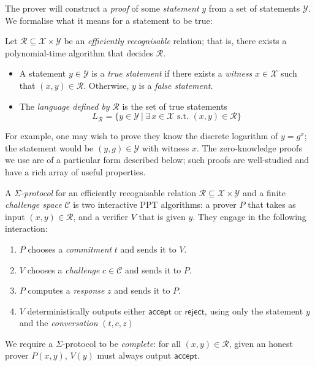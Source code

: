 \documentclass[12pt,a4paper]{article}
\theoremstyle{definition}
\begin{document}
The prover will construct a \textit{proof} of some \textit{statement} $y$ from a set of statements $\mathcal{Y}$. We formalise what it means for a statement to be true:
\begin{definition}
    Let $\mathcal{R}\subseteq\mathcal{X}\times\mathcal{Y}$ be an \textit{efficiently recognisable} relation; that is, there exists a polynomial-time algorithm that decides $\mathcal{R}$.
    \begin{itemize}
        \item A statement $y\in\mathcal{Y}$ is a \textit{true statement} if there exists a \textit{witness} $x\in\mathcal{X}$ such that $(x, y)\in\mathcal{R}$. Otherwise, $y$ is a \textit{false statement}.
        \item The \textit{language defined by} $\mathcal{R}$ is the set of true statements
        $$L_\mathcal{R}=\{y\in\mathcal{Y}\ |\ \exists\, x\in\mathcal{X}\text{ s.t. }(x,y)\in\mathcal{R}\}$$
    \end{itemize}
\end{definition}
For example, one may wish to prove they know the discrete logarithm of $y=g^x$; the statement would be $(y, g)\in\mathcal{Y}$ with witness $x$. The zero-knowledge proofs we use are of a particular form described below; such proofs are well-studied and have a rich array of useful properties.
\begin{definition}
    A $\mathit{\Sigma}$\textit{-protocol} for an efficiently recognisable relation $\mathcal{R}\subseteq\mathcal{X}\times\mathcal{Y}$ and a finite \textit{challenge space} $\mathcal{C}$ is two interactive PPT algorithms: a prover $P$ that takes as input $(x, y)\in\mathcal{R}$, and a verifier $V$ that is given $y$. They engage in the following interaction:
    \begin{enumerate}
        \item $P$ chooses a \textit{commitment} $t$ and sends it to $V$.
        \item $V$ chooses a \textit{challenge} $c\in\mathcal{C}$ and sends it to $P$.
        \item $P$ computes a \textit{response} $z$ and sends it to $P$.
        \item $V$ deterministically outputs either $\mathsf{accept}$ or $\mathsf{reject}$, using only the statement $y$ and the \textit{conversation} $(t, c, z)$
    \end{enumerate}
    We require a $\Sigma$-protocol to be \textit{complete}: for all $(x, y)\in\mathcal{R}$, given an honest prover $P(x, y)$, $V(y)$ must always output $\mathsf{accept}$.
\end{definition}
\end{document}
